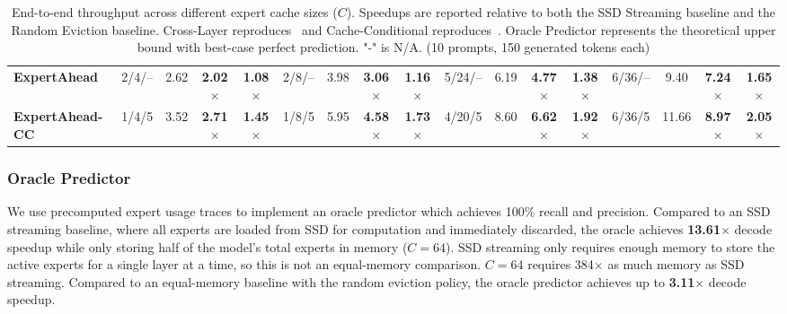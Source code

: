 \begin{table}[t]
{\begin{tabular}{lcccccccccccccccc}
\midrule

\textbf{ExpertAhead}
&
2/4/-- & 2.62 & \textbf{2.02$\times$} & \textbf{1.08$\times$}
&
2/8/-- & 3.98 & \textbf{3.06$\times$} & \textbf{1.16$\times$}
&
5/24/-- & 6.19 & \textbf{4.77$\times$} & \textbf{1.38$\times$}
&
6/36/-- & 9.40 & \textbf{7.24$\times$} & \textbf{1.65$\times$}
\\

\textbf{ExpertAhead-CC}
&
1/4/5 & 3.52 & \textbf{2.71$\times$} & \textbf{1.45$\times$}
&
1/8/5 & 5.95 & \textbf{4.58$\times$} & \textbf{1.73$\times$}
&
4/20/5 & 8.60 & \textbf{6.62$\times$} & \textbf{1.92$\times$}
&
6/36/5 & 11.66 & \textbf{8.97$\times$} & \textbf{2.05$\times$}
\\

\bottomrule
\end{tabular}
}
\caption{End-to-end throughput across different expert cache sizes ($C$). Speedups are reported relative to both the SSD Streaming baseline and the Random Eviction baseline. Cross-Layer  reproduces~\cite{eliseev2023fastinferencemixtureofexpertslanguage} and Cache-Conditional  reproduces~\cite{skliar2025mixturecacheconditionalexpertsefficient}. Oracle Predictor represents the theoretical upper bound with best-case perfect prediction. "-" is N/A. (10 prompts, 150 generated tokens each)}
\label{tab:end_to_end_results}
\end{table}

\subsubsection{Oracle Predictor}
We use precomputed expert usage traces to implement an oracle predictor which achieves 100\% recall and precision. Compared to an SSD streaming baseline, where all experts are loaded from SSD for computation and immediately discarded, the oracle achieves \textbf{13.61$\times$} decode speedup while only storing half of the model's total experts in memory ($C=64$). SSD streaming only requires enough memory to store the active experts for a single layer at a time, so this is not an equal-memory comparison. $C=64$ requires 384$\times$ as much memory as SSD streaming. Compared to an equal-memory baseline with the random eviction policy, the oracle predictor achieves up to \textbf{3.11$\times$} decode speedup. 


